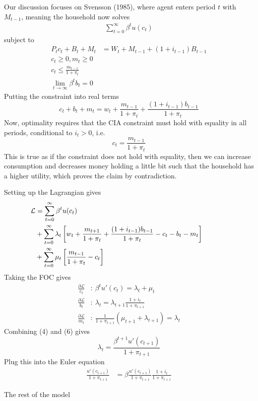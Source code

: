 \documentclass[twocolumn, fleqn]{article}
\begin{document}
	Our discussion focuses on Svensson (1985), where agent enters period $t$ with $M_{t-1}$, meaning the household now solves 
	\begin{align*}
		\sum_{t=0}^\infty \beta^t u(c_t)
	\end{align*}
	subject to 
	\begin{align*}
		P_t c_t + B_t + M_t &= W_t + M_{t-1} + (1+ i_{t-1})B_{t-1}\\
		c_t \geq 0, m_t \geq 0\\
		c_t \leq \frac{m_{t-1}}{1+\pi_t}\\
		\lim_{t\rightarrow \infty} \beta^t b_t =0
	\end{align*}
	Putting the constraint into real terms
	\[c_t + b_t + m_t = w_t + \frac{m_{t-1}}{1+\pi_t} + \frac{(1+i_{t-1})b_{t-1}}{1+\pi_t}\]
	Now, optimality requires that the CIA constraint must hold with equality in all periods, conditional to $i_t>0$, i.e. 
	\[c_t =\frac{m_{t-1}}{1+\pi_t}\] 
	This is true as if the constraint does not hold with equality, then we can increase consumption and decreases money holding a little bit such that the household has a higher utility, which proves the claim by contradiction. 
	
	Setting up the Lagrangian gives 
	\begin{align*}
	\hspace{-36pt}	\mathcal L &= \sum_{t=0}^{\infty} \beta^t u(c_t) \\
	\hspace{-36pt} &+ \sum_{t=0}^{\infty} \lambda_t \left[w_t + \frac{m_{t+1}}{1+\pi_t}+ \frac{(1+i_{t-1})b_{t-1}}{1+\pi_t}-c_t - b_t- m_t \right]\\
	\hspace{-36pt} &+\sum_{t=0}^{\infty} \mu_t \left[ \frac{m_{t-1}}{1+\pi_t}-c_t\right]
	\end{align*}
	Taking the FOC gives
	\begin{align}
		\frac{\partial \mathcal L}{c_t}&: \ \beta^t u'(c_t)=\lambda_t+\mu_t\\
		\frac{\partial \mathcal L}{b_t}&: \ \lambda_t = \lambda_{t+1} \frac{1+i_t}{1+\pi_{t+1}}\\
		\frac{\partial \mathcal L}{m_t}&: \ \frac{1}{1+\pi_{t+1}}(\mu_{t+1} + \lambda_{t+1} )= \lambda_t 
	\end{align}
	Combining (4) and (6) gives 
	\[ \lambda_t = \frac{\beta^{t+1}u'(c_{t+1})}{1+\pi_{t+1}}\]
	Plug this into the Euler equation 
	\begin{align*}
		\frac{u'(c_{t+1})}{1+\pi_{t+1}} &= \beta \frac{u'(c_{t+1})}{1+\pi_{t+1}}\frac{1+i_t}{1+\pi_{t+1}}
	\end{align*}
	
	The rest of the model 
	
	
	
	
	
	
	 

	
\end{document}
